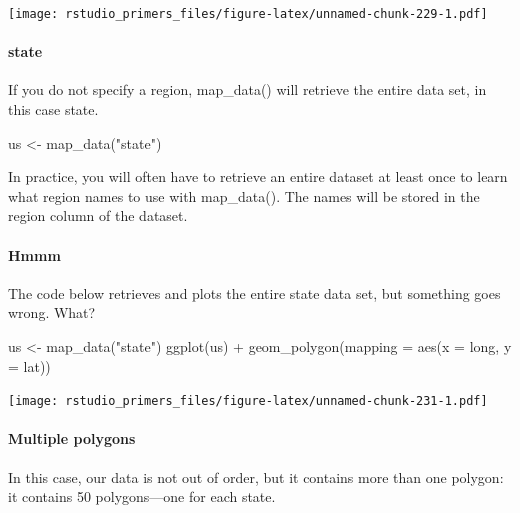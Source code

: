 \documentclass[
]{article}
\newenvironment{Shaded}{\begin{snugshade}}{\end{snugshade}}
\newcommand{\AttributeTok}[1]{\textcolor[rgb]{0.77,0.63,0.00}{#1}}
\newcommand{\FunctionTok}[1]{\textcolor[rgb]{0.00,0.00,0.00}{#1}}
\newcommand{\NormalTok}[1]{#1}
\newcommand{\OtherTok}[1]{\textcolor[rgb]{0.56,0.35,0.01}{#1}}
\newcommand{\SpecialCharTok}[1]{\textcolor[rgb]{0.00,0.00,0.00}{#1}}
\newcommand{\StringTok}[1]{\textcolor[rgb]{0.31,0.60,0.02}{#1}}
\begin{document}
\texttt{[image: rstudio\_primers\_files/figure-latex/unnamed-chunk-229-1.pdf]}

\hypertarget{state}{%
\paragraph{state}\label{state}}

If you do not specify a region, map\_data() will retrieve the entire
data set, in this case state.

\begin{Shaded}
\begin{Highlighting}[]
\NormalTok{us }\OtherTok{\textless{}{-}} \FunctionTok{map\_data}\NormalTok{(}\StringTok{"state"}\NormalTok{)}
\end{Highlighting}
\end{Shaded}

In practice, you will often have to retrieve an entire dataset at least
once to learn what region names to use with map\_data(). The names will
be stored in the region column of the dataset.

\hypertarget{hmmm}{%
\paragraph{Hmmm}\label{hmmm}}

The code below retrieves and plots the entire state data set, but
something goes wrong. What?

\begin{Shaded}
\begin{Highlighting}[]
\NormalTok{us }\OtherTok{\textless{}{-}} \FunctionTok{map\_data}\NormalTok{(}\StringTok{"state"}\NormalTok{)}
\FunctionTok{ggplot}\NormalTok{(us) }\SpecialCharTok{+}
  \FunctionTok{geom\_polygon}\NormalTok{(}\AttributeTok{mapping =} \FunctionTok{aes}\NormalTok{(}\AttributeTok{x =}\NormalTok{ long, }\AttributeTok{y =}\NormalTok{ lat))}
\end{Highlighting}
\end{Shaded}

\texttt{[image: rstudio\_primers\_files/figure-latex/unnamed-chunk-231-1.pdf]}

\hypertarget{multiple-polygons}{%
\paragraph{Multiple polygons}\label{multiple-polygons}}

In this case, our data is not out of order, but it contains more than
one polygon: it contains 50 polygons---one for each state.
\end{document}
